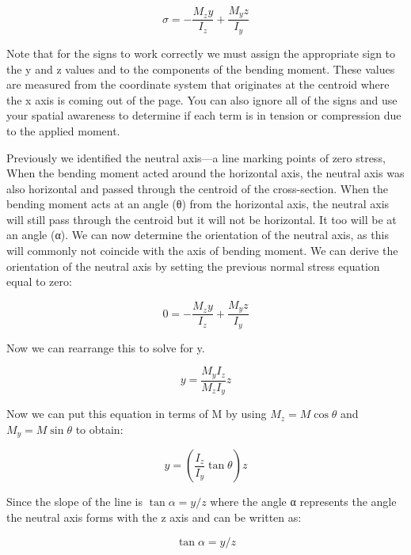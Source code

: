 \documentclass[
  letterpaper,
  DIV=11,
  numbers=noendperiod]{scrreprt}
\begin{document}
\[
\sigma=-\frac{M_z y}{I_z}+\frac{M_y z}{I_y}
\]

Note that for the signs to work correctly we must assign the appropriate
sign to the y and z values and to the components of the bending moment.
These values are measured from the coordinate system that originates at
the centroid where the x axis is coming out of the page. You can also
ignore all of the signs and use your spatial awareness to determine if
each term is in tension or compression due to the applied moment.

Previously we identified the neutral axis---a line marking points of
zero stress, When the bending moment acted around the horizontal axis,
the neutral axis was also horizontal and passed through the centroid of
the cross-section. When the bending moment acts at an angle (θ) from the
horizontal axis, the neutral axis will still pass through the centroid
but it will not be horizontal. It too will be at an angle (α). We can
now determine the orientation of the neutral axis, as this will commonly
not coincide with the axis of bending moment. We can derive the
orientation of the neutral axis by setting the previous normal stress
equation equal to zero:

\[
0=-\frac{M_z y}{I_z}+\frac{M_y z}{I_y}
\]

Now we can rearrange this to solve for y.

\[
y=\frac{M_y I_z}{M_z I_y} z
\]

Now we can put this equation in terms of M by using
\(M_z=M \cos \theta\) and \(M_y=M \sin \theta\) to obtain:

\[
y=\left(\frac{I_z}{I_y} \tan \theta\right) z
\]

Since the slope of the line is \(\tan \alpha=y / z\) where the angle α
represents the angle the neutral axis forms with the z axis and can be
written as:

\[
\tan \alpha=y / z
\]
\end{document}
